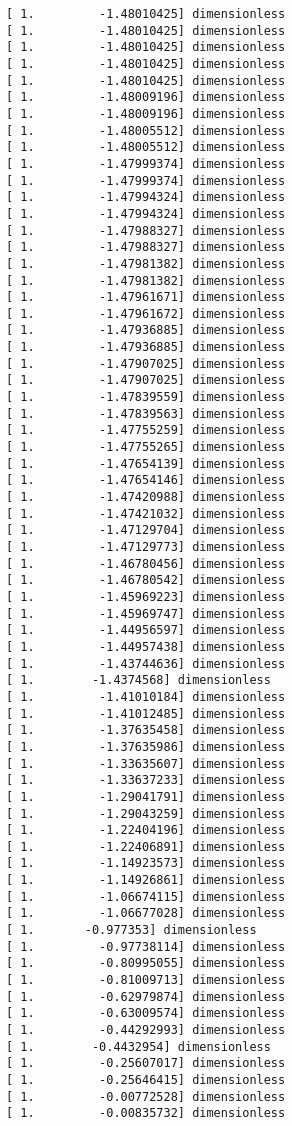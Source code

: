 \documentclass[11pt]{article}
\begin{document}
    \begin{Verbatim}[commandchars=\\\{\}]
[ 1.         -1.48010425] dimensionless
[ 1.         -1.48010425] dimensionless
[ 1.         -1.48010425] dimensionless
[ 1.         -1.48010425] dimensionless
[ 1.         -1.48010425] dimensionless
[ 1.         -1.48009196] dimensionless
[ 1.         -1.48009196] dimensionless
[ 1.         -1.48005512] dimensionless
[ 1.         -1.48005512] dimensionless
[ 1.         -1.47999374] dimensionless
[ 1.         -1.47999374] dimensionless
[ 1.         -1.47994324] dimensionless
[ 1.         -1.47994324] dimensionless
[ 1.         -1.47988327] dimensionless
[ 1.         -1.47988327] dimensionless
[ 1.         -1.47981382] dimensionless
[ 1.         -1.47981382] dimensionless
[ 1.         -1.47961671] dimensionless
[ 1.         -1.47961672] dimensionless
[ 1.         -1.47936885] dimensionless
[ 1.         -1.47936885] dimensionless
[ 1.         -1.47907025] dimensionless
[ 1.         -1.47907025] dimensionless
[ 1.         -1.47839559] dimensionless
[ 1.         -1.47839563] dimensionless
[ 1.         -1.47755259] dimensionless
[ 1.         -1.47755265] dimensionless
[ 1.         -1.47654139] dimensionless
[ 1.         -1.47654146] dimensionless
[ 1.         -1.47420988] dimensionless
[ 1.         -1.47421032] dimensionless
[ 1.         -1.47129704] dimensionless
[ 1.         -1.47129773] dimensionless
[ 1.         -1.46780456] dimensionless
[ 1.         -1.46780542] dimensionless
[ 1.         -1.45969223] dimensionless
[ 1.         -1.45969747] dimensionless
[ 1.         -1.44956597] dimensionless
[ 1.         -1.44957438] dimensionless
[ 1.         -1.43744636] dimensionless
[ 1.        -1.4374568] dimensionless
[ 1.         -1.41010184] dimensionless
[ 1.         -1.41012485] dimensionless
[ 1.         -1.37635458] dimensionless
[ 1.         -1.37635986] dimensionless
[ 1.         -1.33635607] dimensionless
[ 1.         -1.33637233] dimensionless
[ 1.         -1.29041791] dimensionless
[ 1.         -1.29043259] dimensionless
[ 1.         -1.22404196] dimensionless
[ 1.         -1.22406891] dimensionless
[ 1.         -1.14923573] dimensionless
[ 1.         -1.14926861] dimensionless
[ 1.         -1.06674115] dimensionless
[ 1.         -1.06677028] dimensionless
[ 1.       -0.977353] dimensionless
[ 1.         -0.97738114] dimensionless
[ 1.         -0.80995055] dimensionless
[ 1.         -0.81009713] dimensionless
[ 1.         -0.62979874] dimensionless
[ 1.         -0.63009574] dimensionless
[ 1.         -0.44292993] dimensionless
[ 1.        -0.4432954] dimensionless
[ 1.         -0.25607017] dimensionless
[ 1.         -0.25646415] dimensionless
[ 1.         -0.00772528] dimensionless
[ 1.         -0.00835732] dimensionless

    \end{Verbatim}
\end{document}
